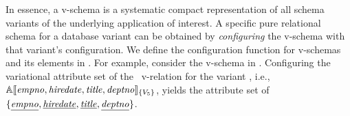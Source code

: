 In essence, a v-schema is a systematic  
compact representation of all schema variants of the 
underlying application of interest.
A specific pure relational schema for
a database variant can be obtained 
by \emph{configuring} the v-schema with that variant's configuration.
We define the configuration function for v-schemas and its elements in .
For example, consider the v-schema in .
Configuring the variational attribute set of the \empacct\ v-relation for 
the variant \setDef {\vFive}, i.e., 
\ensuremath {\olSem [\setDef {\vFive}] {\empno, \hiredate, \titleatt, \deptno}},
yields the 
attribute set of
\ensuremath {\setDef {\underline \empno,\underline \hiredate,\underline \titleatt,\underline \deptno }}.



